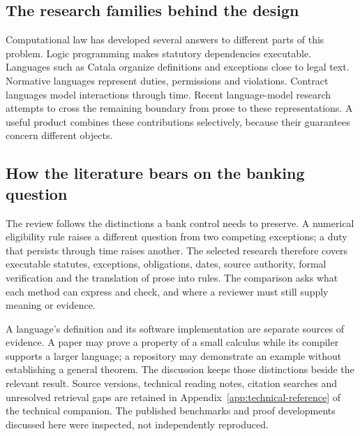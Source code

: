 \subsection{The research families behind the design}
\label{merge:P-02-literature:00}

\label{sec:literature}

Computational law has developed several answers to different parts of this
problem. Logic programming makes statutory dependencies executable. Languages
such as Catala organize definitions and exceptions close to legal text. Normative
languages represent duties, permissions and violations. Contract languages model
interactions through time. Recent language-model research attempts to cross the
remaining boundary from prose to these representations. A useful product combines
these contributions selectively, because their guarantees concern different
objects.

\subsection{How the literature bears on the banking question}

The review follows the distinctions a bank control needs to preserve. A numerical
eligibility rule raises a different question from two competing exceptions; a
duty that persists through time raises another. The selected research therefore
covers executable statutes, exceptions, obligations, dates, source authority,
formal verification and the translation of prose into rules. The comparison asks
what each method can express and check, and where a reviewer must still supply
meaning or evidence.

A language's definition and its software implementation are separate sources of
evidence. A paper may prove a property of a small calculus while its compiler
supports a larger language; a repository may demonstrate an example without
establishing a general theorem. The discussion keeps those distinctions beside
the relevant result. Source versions, technical reading notes, citation searches
and unresolved retrieval gaps are retained in
Appendix~\ref{app:technical-reference} of the technical companion. The published benchmarks and proof
developments discussed here were inspected, not independently reproduced.




